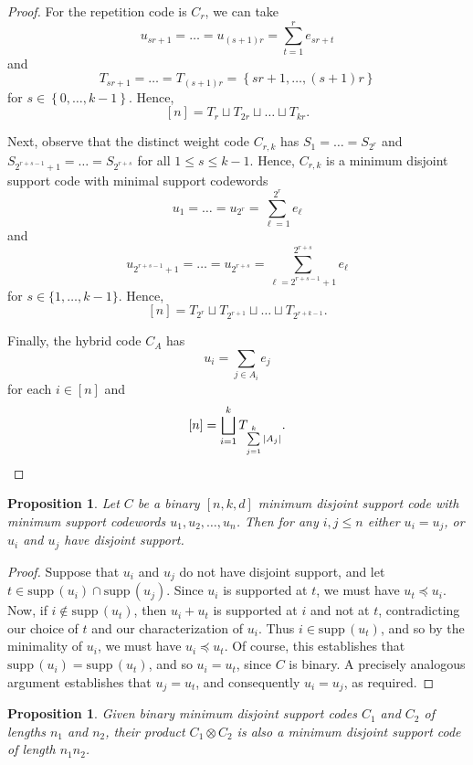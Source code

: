 \documentclass[12pt]{article}
\def\supp{\mathrm{supp}\,}
\newtheorem{proposition}[theorem]{Proposition}
\theoremstyle{definition}
\begin{document}
\begin{proof}
For the repetition code is $C_r$, we can take
$$u_{sr+1}=\dots=u_{(s+1)r}=\sum_{t=1}^r e_{sr+t}$$ and 
$$T_{sr+1}=\dots=T_{(s+1)r}= \left\{ sr+1, \dots, (s+1)r \right\}$$
for $s \in \left\{ 0, \dots, k-1 \right\}$. Hence, $$[n]= T_r \sqcup T_{2r} \sqcup \dots \sqcup T_{kr}.$$

Next, observe that the distinct weight code $C_{r,k}$ has $S_1=\dots=S_{2^r}$ and $S_{2^{r+s-1}+1}=\dots=S_{2^{r+s}}$ for all $1 \leq s \leq k-1$. 
Hence, $C_{r,k}$ is a minimum disjoint support code with minimal support codewords
$$
u_1=\dots=u_{2^r} = \sum_{\ell=1}^{2^r} e_\ell$$
and 
$$
u_{2^{r+s-1}+1}=\dots=u_{2^{r+s}} = \sum_{\ell=2^{r+s-1}+1}^{2^{r+s}} e_\ell$$ for $s \in \{ 1, \dots, k-1\}$. 
Hence, $$[n]= T_{2^r} \sqcup T_{2^{r+1}} \sqcup \dots \sqcup T_{2^{r+k-1}}.$$

Finally, the hybrid code $C_A$ has $$u_i=\sum_{j \in A_i} e_j$$ for each $i \in [n]$ and 
\[[n] = \bigsqcup_{i=1}^k T_{\sum\limits_{j=1}^k | A_j |}. \qedhere\]

\end{proof}

\begin{proposition}
\label{prop:DisjointSupport}
Let \(C\) be a binary \([n,k,d]\) minimum disjoint support code with minimum support codewords \(u_1, u_2, \hdots, u_n\). Then for any \(i,j \leq n\) either \(u_i = u_j\), or \(u_i\) and \(u_j\) have disjoint support.
\end{proposition}

\begin{proof}
Suppose that \(u_i\) and \(u_j\) do not have disjoint support, and let \(t \in \supp(u_i) \cap \supp(u_j)\). Since \(u_i\) is supported at \(t\), we must have \(u_t \preceq u_i\). Now, if \(i \not\in \supp(u_t)\), then \(u_i + u_t\) is supported at \(i\) and not at \(t\), contradicting our choice of \(t\) and our characterization of \(u_i\). Thus \(i \in \supp(u_t)\), and so by the minimality of \(u_i\), we must have \(u_i \preceq u_t\). Of course, this establishes that \(\supp(u_i) = \supp(u_t)\), and so \(u_i = u_t\), since \(C\) is binary. A precisely analogous argument establishes that \(u_j = u_t\), and consequently \(u_i = u_j\), as required.
\end{proof}

\begin{proposition}
    Given binary minimum disjoint support codes $C_1$ and $C_2$ of lengths $n_1$ and $n_2$, their product $C_1 \otimes C_2$ is also a minimum disjoint support code of length $n_1n_2$. 
\end{proposition}
\end{document}
